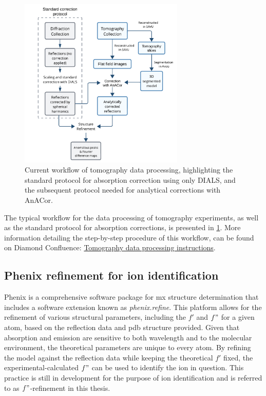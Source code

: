 \begin{figure}[H]
    \centering
    \includegraphics[width = 0.7\textwidth]{images/workflow.png}
    \caption{Current workflow of tomography data processing, highlighting the standard protocol for absorption correction using only DIALS, and the subsequent protocol needed for analytical corrections with AnACor.}
    \label{fig:workflow}
\end{figure}

The typical workflow for the data processing of tomography experiments, as well as the standard  protocol for absorption corrections, is presented in \cref{fig:workflow}. More information detailing the step-by-step procedure of this workflow, can be found on Diamond Confluence: \href{https://confluence.diamond.ac.uk/x/yIWuD}{Tomography data processing instructions}. %

\subsection{Phenix refinement for ion identification}%

Phenix is a comprehensive software package for \ac{mx} structure determination that includes a software extension known as \textit{phenix.refine}. This platform allows for the refinement of various structural parameters, including the $f'$ and $f"$ for a given atom, based on the reflection data and \ac{pdb} structure provided. Given that absorption and emission are sensitive to both wavelength and to the molecular environment, the theoretical parameters are unique to every atom. By refining the model against the reflection data while keeping the theoretical $f'$ fixed, the experimental-calculated $f"$ can be used to identify the ion in question. This practice is still in development for the purpose of ion identification and is referred to as $f"$-refinement in this thesis.%

